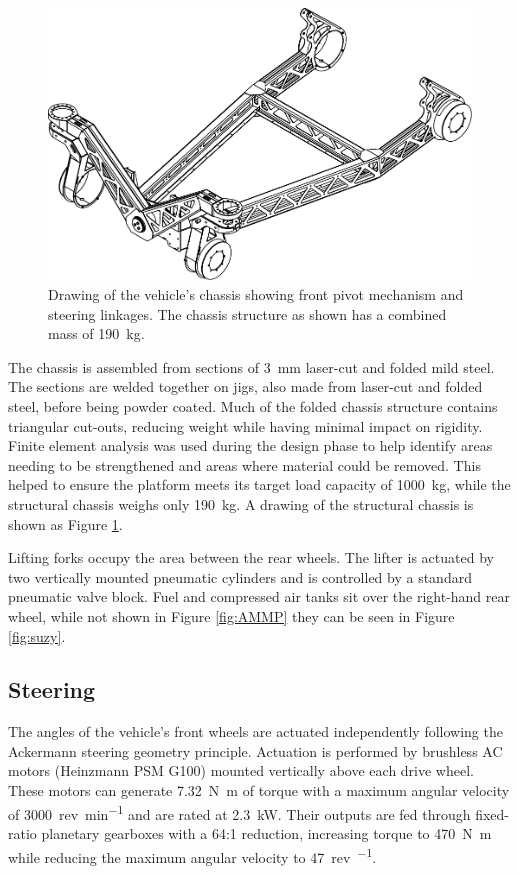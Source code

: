 \documentclass[preprint,authoryear,12pt]{elsarticle}
\begin{document}
        \begin{figure}[htb]
            \centering
            \includegraphics[width=0.6\linewidth]{imgs/profile_views/AMMP-Chassis-1-20.pdf}
            \caption{Drawing of the vehicle's chassis showing front pivot mechanism and steering linkages. The chassis structure as shown has a combined mass of \SI{190}{\kilo\gram}.}
            \label{fig:AMMPChassis}
        \end{figure}

        The chassis is assembled from sections of \SI{3}{\milli\meter} laser-cut and folded mild steel.
        The sections are welded together on jigs, also made from laser-cut and folded steel, before being powder coated.
        Much of the folded chassis structure contains triangular cut-outs, reducing weight while having minimal impact on rigidity.
        Finite element analysis was used during the design phase to help identify areas needing to be strengthened and areas where material could be removed.
        This helped to ensure the platform meets its target load capacity of \SI{1000}{\kilo\gram}, while the structural chassis weighs only \SI{190}{\kilo\gram}.
        A drawing of the structural chassis is shown as Figure \ref{fig:AMMPChassis}.

        Lifting forks occupy the area between the rear wheels.
        The lifter is actuated by two vertically mounted pneumatic cylinders and is controlled by a standard pneumatic valve block.
        Fuel and compressed air tanks sit over the right-hand rear wheel, while not shown in Figure \ref{fig:AMMP} they can be seen in Figure \ref{fig:suzy}.

    \subsection{Steering}
    \label{sub:steering}

        The angles of the vehicle's front wheels are actuated independently following the Ackermann steering geometry principle.
        Actuation is performed by brushless AC motors (Heinzmann PSM G100) mounted vertically above each drive wheel.
        These motors can generate \SI{7.32}{\newton\meter} of torque with a maximum angular velocity of \SI{3000}{rev\per\minute} and are rated at \SI{2.3}{\kilo\watt}.
        Their outputs are fed through fixed-ratio planetary gearboxes with a 64:1 reduction, increasing torque to \SI{470}{\newton\meter} while reducing the maximum angular velocity to \SI{47}{rev\per\min}.
\end{document}
